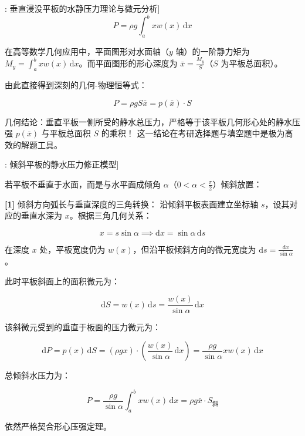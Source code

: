 \documentclass[11pt,a4paper,UTF8]{ctexart}
\begin{document}
\begin{thmbox}[模型[2]: 垂直浸没平板的水静压力理论与微元分析]
\begin{equation*}
P = \rho g \int_a^b x w(x)\,\mathrm{d}x
\end{equation*}


在高等数学几何应用中，平面图形对水面轴（$y$ 轴）的一阶静力矩为 $M_y = \int_a^b x w(x)\,\mathrm{d}x$。而平面图形的形心深度为 $\bar{x} = \frac{M_y}{S}$（$S$ 为平板总面积）。

由此直接得到深刻的几何-物理恒等式：


\begin{equation*}
P = \rho g S \bar{x} = p(\bar{x}) \cdot S
\end{equation*}


几何结论：\textit{}垂直平板一侧所受的静水总压力，严格等于该平板几何形心处的静水压强 $p(\bar{x})$ 与平板总面积 $S$ 的乘积！\textit{} 这一结论在考研选择题与填空题中是极为高效的解题工具。

\end{thmbox}
\begin{thmbox}[模型[3]: 倾斜平板的静水压力修正模型]

若平板不垂直于水面，而是与水平面成倾角 $\alpha$（$0 < \alpha < \frac{\pi}{2}$）倾斜放置：

\textbf{[1]} 倾斜方向弧长与垂直深度的三角转换：
沿倾斜平板表面建立坐标轴 $s$，设其对应的垂直水深为 $x$。根据三角几何关系：


\begin{equation*}
x = s \sin\alpha \implies \mathrm{d}x = \sin\alpha\,\mathrm{d}s
\end{equation*}


在深度 $x$ 处，平板宽度仍为 $w(x)$，但沿平板倾斜方向的微元宽度为 $\mathrm{d}s = \frac{\mathrm{d}x}{\sin\alpha}$。

此时平板斜面上的面积微元为：


\begin{equation*}
\mathrm{d}S = w(x)\,\mathrm{d}s = \frac{w(x)}{\sin\alpha}\,\mathrm{d}x
\end{equation*}


该斜微元受到的垂直于板面的压力微元为：


\begin{equation*}
\mathrm{d}P = p(x)\,\mathrm{d}S = (\rho g x) \cdot \left(\frac{w(x)}{\sin\alpha}\,\mathrm{d}x\right) = \frac{\rho g}{\sin\alpha} x w(x)\,\mathrm{d}x
\end{equation*}


总倾斜水压力为：


\begin{equation*}
P = \frac{\rho g}{\sin\alpha} \int_a^b x w(x)\,\mathrm{d}x = \rho g \bar{x} \cdot S_{\text{斜}}
\end{equation*}


依然严格契合形心压强定理。

\end{thmbox}
\end{document}
